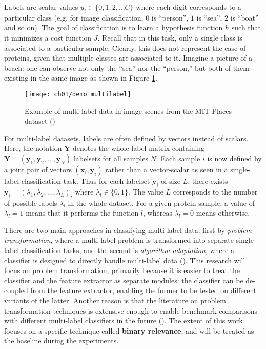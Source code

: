 \par Labels are scalar values $y_{i} \in \{0, 1, 2, \dots C\}$ where each digit 
corresponds to a particular class (e.g. for image classification, $0$ is
``person'', $1$ is ``sea'', $2$ is ``boat'' and so on). The goal of
classification is to learn a hypothesis function $h$ such that it minimizes a
cost function $J$. Recall that in this task, only a single class is associated
to a particular sample. Clearly, this does not represent the case of proteins,
given that multiple classes are associated to it. Imagine a picture of a beach:
one can observe not only the ``sea'' nor the ``person,'' but both of them
existing in the same image as shown in Figure \ref{demo:multilabel}.

\begin{figure}[!t]
  \centering
  \texttt{[image: ch01/demo\_multilabel]}
  \caption[Example of multi-label data in image scenes from MIT
  Places dataset]{
      Example of multi-label data in image scenes from the MIT
      Places dataset (\cite{zhou2014learning})}
  \label{demo:multilabel}
\end{figure}

\par For multi-label datasets, labels are often defined by vectors instead of
scalars. Here, the notation $\mathbf{Y}$ denotes the whole label matrix
containing $\mathbf{Y} = (\mathbf{y}_{1},\mathbf{y}_{2}, \dots,
\mathbf{y}_{N})$ labelsets for all samples $N$. Each sample $i$ is now defined
by a joint pair of vectors $(\mathbf{x}_{i}, \mathbf{y}_{i})$ rather than a
vector-scalar as seen in a single-label classification task. Thus for each
labelset $\mathbf{y}_{i}$ of size $L$, there exists $\mathbf{y}_{i} =
(\lambda_{1}, \lambda_{2}, \dots, \lambda_{L})_{i}$ where $\lambda_{l} \in \{0,
1\}$. The value $L$ corresponds to the number of possible labels $\lambda_{l}$
in the whole dataset. For a given protein sample, a value of $\lambda_{l}=1$
means that it performs the function $l$, whereas $\lambda_{l}=0$ means
otherwise.

\par There are two main approaches in classifying multi-label data: first by
\textit{problem transformation}, where a multi-label problem is transformed
into separate single-label classification tasks, and the second is
\textit{algorithm adaptation}, where a classifier is designed to 
directly handle multi-label data (\cite{tsoumakas2007multilabel}). This
research will focus on problem transformation, primarily because it is easier
to treat the classifier and the feature extractor as separate modules: the
classifier can be de-coupled from the feature extractor, enabling the former
to be tested on different variants of the latter.  Another reason is that the
literature on problem transformation techniques is extensive enough to
enable benchmark comparisons with different multi-label classifiers in the
future (\cite{zhang2014review, madjarov2012extensive}). The extent
of this work focuses on a specific technique called \textbf{binary relevance},
and will be treated as the baseline during the experiments.


